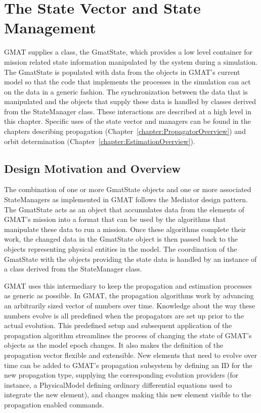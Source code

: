 \chapter{\label{chapter:PropagatorStates}The State Vector and State Management}

GMAT supplies a class, the GmatState, which provides a low level container for mission related
state information manipulated by the system during a simulation.  The GmatState is populated with
data from the objects in GMAT's current model so that the code that implements the processes in the
simulation can act on the data in a generic fashion.  The synchronization between the data that
is manipulated and the objects that supply these data is handled by classes derived from the
StateManager class.  These interactions are described at a high level in this chapter.  Specific
uses of the state vector and managers can be found in the chapters describing propagation
(Chapter~\ref{chapter:PropagatorOverview}) and orbit determination
(Chapter~\ref{chapter:EstimationOverview}).

\section{Design Motivation and Overview}

The combination of one or more GmatState objects and one or more associated StateManagers as
implemented in GMAT follows the Mediator design pattern.  The GmatState acts as an object
that accumulates data from the elements of GMAT's mission into a format that can be used by the
algorithms that manipulate these data to run a mission.  Once these algorithms complete their work,
the changed data in the GmatState object is then passed back to the objects representing physical
entities in the model.  The coordination of the GmatState with the objects providing the state data
is handled by an instance of a class derived from the StateManager class.

GMAT uses this intermediary to keep the propagation and estimation processes as generic as
possible.  In GMAT, the propagation algorithms work by advancing an arbitrarily sized vector of
numbers over time.  Knowledge about the way these numbers evolve is all predefined when the
propagators are set up prior to the actual evolution.  This predefined setup and subsequent
application of the propagation algorithm streamlines the process of changing the state of GMAT's
objects as the model epoch changes.  It also makes the definition of the propagation vector
flexible and extensible.  New elements that need to evolve over time can be added to GMAT's
propagation subsystem by defining an ID for the new propagation type, supplying the corresponding
evolution providers (for instance, a PhysicalModel defining ordinary differential equations used
to integrate the new element), and changes making this new element visible to the propagation
enabled commands.

